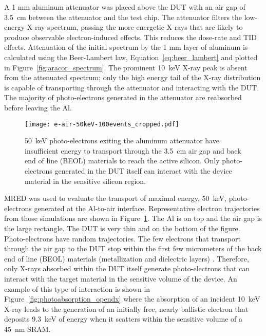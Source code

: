A 1 mm aluminum attenuator was placed above the DUT with an air gap of 3.5~cm between the attenuator and the test chip.
The attenuator filters the low-energy X-ray spectrum, passing the more energetic X-rays that are likely to produce observable electron-induced effects. 
This reduces the dose-rate and TID effects. 
Attenuation of the initial spectrum by the 1 mm layer of aluminum is calculated using the Beer-Lambert law, Equation~\ref{eq:beer_lambert} and plotted in Figure~\ref{fig:aracor_spectrum}.
The prominent 10~keV X-ray peak is absent from the attenuated spectrum; only the high energy tail of the X-ray distribution is capable of transporting through the attenuator and interacting with the DUT.
The majority of photo-electrons generated in the attenuator are reabsorbed before leaving the Al.

\begin{figure}[tb]
    \begin{center}
        \texttt{[image: e-air-50keV-100events\_cropped.pdf]}
    \end{center}
    \caption{50~keV photo-electrons exiting the aluminum attenuator have insufficient energy to transport through the 3.5~cm air gap and back end of line (BEOL) materials to reach the active silicon. Only photo-electrons generated in the DUT itself can interact with the device material in the sensitive silicon region.}
    \label{fig:air_gap}
\end{figure}

MRED \cite{Weller:2010ud} was used to evaluate the transport of maximal energy, 50~keV, photo-electrons generated at the Al-to-air interface. 
Representative electron trajectories from those simulations are shown in Figure~\ref{fig:air_gap}.
The Al is on top and the air gap is the large rectangle.
The DUT is very thin and on the bottom of the figure.
Photo-electrons have random trajectories. 
The few electrons that transport through the air gap to the DUT stop within the first few micrometers of the back end of line (BEOL) materials (metallization and dielectric layers) \cite{Dasgupta:2011mg}.
Therefore, only X-rays absorbed within the DUT itself generate photo-electrons that can interact with the target material in the sensitive volume of the device.
An example of this type of interaction is shown in Figure~\ref{fig:photoabsorption_opendx} where the absorption of an incident 10~keV X-ray leads to the generation of an initially free, nearly ballistic electron that deposits 9.3~keV of energy when it scatters within the sensitive volume of a 45~nm SRAM.

